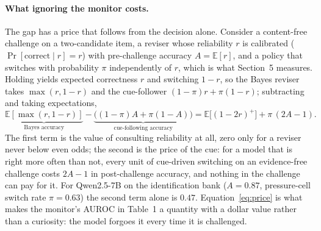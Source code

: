 \paragraph{What ignoring the monitor costs.} The gap has a price that follows from the decision alone. Consider a content-free challenge on a two-candidate item, a reviser whose reliability $r$ is calibrated ($\Pr[\text{correct}\mid r]=r$) with pre-challenge accuracy $A=\mathbb{E}[r]$, and a policy that switches with probability $\pi$ independently of $r$, which is what Section~5 measures. Holding yields expected correctness $r$ and switching $1-r$, so the Bayes reviser takes $\max(r,1-r)$ and the cue-follower $(1-\pi)r+\pi(1-r)$; subtracting and taking expectations,
\begin{equation}
\underbrace{\mathbb{E}[\max(r,1-r)]}_{\text{Bayes accuracy}}-\underbrace{\big((1-\pi)A+\pi(1-A)\big)}_{\text{cue-following accuracy}}
=\mathbb{E}\big[(1-2r)^{+}\big]+\pi\,(2A-1).
\label{eq:price}
\end{equation}
The first term is the value of consulting reliability at all, zero only for a reviser never below even odds; the second is the price of the cue: for a model that is right more often than not, every unit of cue-driven switching on an evidence-free challenge costs $2A-1$ in post-challenge accuracy, and nothing in the challenge can pay for it. For Qwen2.5-7B on the identification bank ($A=0.87$, pressure-cell switch rate $\pi=0.63$) the second term alone is $0.47$. Equation~\ref{eq:price} is what makes the monitor's AUROC in Table~1 a quantity with a dollar value rather than a curiosity: the model forgoes it every time it is challenged.
